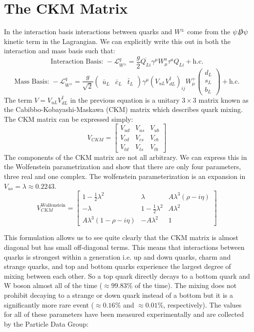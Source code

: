 \section{The CKM Matrix}
In the interaction basis interactions between quarks and $W^\pm$ come from the $\psi\slashed{D}\psi$ kinetic term in the Lagrangian.  We can explicitly write this out in both the interaction and mass basis such that:
\[\text{Interaction Basis: } -\mathcal{L}^q_{W^\pm} =\frac{g}{2}\overline{Q_{Li}}\gamma^{\mu}W_{\mu}^a\tau^a Q_{Li} +\text{h.c.}\]
\[\text{Mass Basis: } -\mathcal{L}^q_{W^\pm} =\frac{g}{\sqrt{2}}\begin{pmatrix}\bar{u}_L &\bar{c}_L &\bar{t}_L\end{pmatrix}\gamma^\mu (V_{uL}V_{dL}^{\dagger})_{ij}W_{\mu}^+ \begin{pmatrix} d_L \\s_L \\b_L\end{pmatrix}+\text{h.c.} \]
The term $V=V_{uL}V_{dL}^{\dagger}$ in the previous equation is a unitary $3\times3$ matrix known as the Cabibbo-Kobayashi-Maskawa (CKM) matrix \cite{CKM1,CKM2} which describes quark mixing.  The CKM matrix can be expressed simply:
\[
V_{CKM} = 
\begin{bmatrix}
V_{ud} & V_{us} & V_{ub} \\
V_{cd} & V_{cs} & V_{cb} \\
V_{td} & V_{ts} & V_{tb}
\end{bmatrix}
\]
The components of the CKM matrix are not all arbitrary.  We can express this in the Wolfenstein parametrization\cite{Wolfenstein} and show that there are only four parameters, three real and one complex.  The wolfenstein parameterization is an expansion in $V_{us}=\lambda \approx 0.2243$.
\[
V_{CKM}^\text{Wolfenstein} = 
\begin{bmatrix}
1-\frac{1}{2}\lambda^2 	& \lambda			  & A \lambda^3(\rho - i \eta) \\
-\lambda 			& 1-\frac{1}{2}\lambda^2	  & A\lambda^2 \\
A\lambda^3(1-\rho -i\eta) & -A \lambda^2		 & 1
\end{bmatrix}
\]

This formulation allows us to see quite clearly that the CKM matrix is almost diagonal but has small off-diagonal terms.  This means that interactions between quarks is strongest within a generation i.e. up and down quarks, charm and strange quarks, and top and bottom quarks experience the largest degree of mixing between each other. So a top quark directly decays to a bottom quark and W boson almost all of the time ($\approx 99.83\%$ of the time).  The mixing does not prohibit decaying to a strange or down quark instead of a bottom but it is a significantly more rare event ($\approx 0.16\%$ and $\approx 0.01\%$, respectively).  The values for all of these parameters have been measured experimentally and are collected by the Particle Data Group\cite{PDG2018}: 


